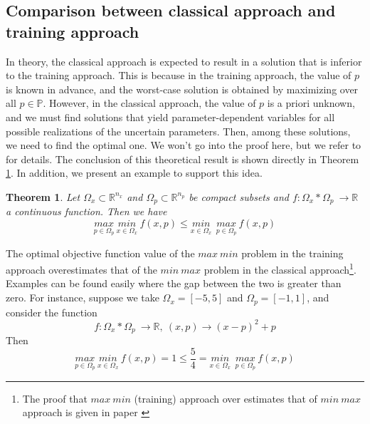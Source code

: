 \documentclass  [
  paper    = a4,
  BCOR     = 10mm,
  twoside,
  fontsize = 12pt,
  fleqn,
  toc      = bibnumbered,
  toc      = listofnumbered,
  numbers  = noendperiod,
  headings = normal,
  listof   = leveldown,
  version  = 3.03
]                                       {scrreprt}
\newcommand{\<}{\langle}
\renewcommand{\>}{\rangle}
\newtheorem{theorem}{Theorem}
\begin{document}
  
\subsection{Comparison between classical approach and training approach}
\label{Comparison}
In theory, the classical approach is expected to result in a solution that is inferior to the training approach. This is because in the training approach, the value of $p$ is known in advance, and the worst-case solution is obtained by maximizing over all $p \in \mathbb{P}$. However, in the classical approach, the value of $p$ is a priori unknown, and we must find solutions that yield parameter-dependent variables for all possible realizations of the uncertain parameters. Then, among these solutions, we need to find the optimal one. We won't go into the proof here, but we refer to \cite{MatSch22} for details. The conclusion of this theoretical result is shown directly in Theorem \ref{Theorem_compare}. In addition, we present an example to support this idea.



\begin{theorem} Let $\Omega_x \subset \mathbb{R}^{n_x}$ and $\Omega_p \subset \mathbb{R}^{n_p}$ be compact subsets and $f : \Omega_x *  \Omega_p \  \rightarrow \mathbb{R}$ a continuous function. Then we have
	\begin{equation}
	\underset{p \in \Omega_p}{max}\ \underset{x \in \Omega_x}{min}\ f (x,p) \leq \underset{x \in \Omega_x}{min}\ \ \underset{p \in \Omega_p}{max}\ f (x,p)
	\end{equation}
\label{Theorem_compare}
\end{theorem}

The optimal objective function value of the $max\ min$ problem in the training approach overestimates that of the $min\ max$ problem in the classical approach\footnote{The proof that $max\ min$  (training) approach over estimates that of $min \ max$ approach is given in paper \cite{MatSch22}}. Examples can be found easily where the gap between the two is greater than zero. For instance, suppose we take $\Omega_x=[-5,5]$ and $\Omega_p=[-1,1]$, and consider the function
$$
f : \Omega_x *  \Omega_p \  \rightarrow \mathbb{R}, \ (x,p) \rightarrow (x-p)^2 + p
$$
Then
$$	\underset{p \in \Omega_p}{max}\ \underset{x \in \Omega_x}{min}\ f (x,p) =1 \leq \frac{5}{4} = \underset{x \in \Omega_x}{min}\ \ \underset{p \in \Omega_p}{max}\ f (x,p)
$$
\end{document}
